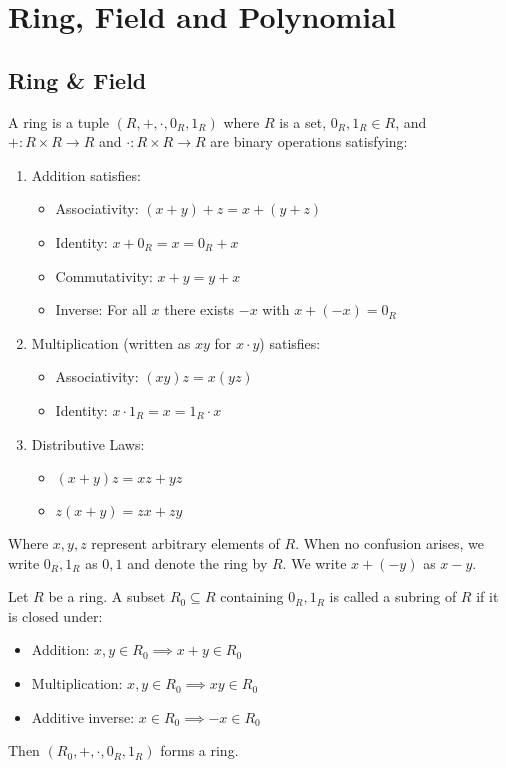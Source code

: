 
\chapter{Ring, Field and Polynomial}

\section{Ring \& Field}

\begin{definition}[Ring]
  A ring is a tuple $(R,+,\cdot,0_R,1_R)$ where $R$ is a set, $0_R,1_R \in R$, and $+: R \times R \to R$ and $\cdot: R \times R \to R$ are binary operations satisfying:
  \begin{enumerate}
    \item Addition satisfies:
      \begin{itemize}
        \item Associativity: $(x + y) + z = x + (y + z)$
        \item Identity: $x + 0_R = x = 0_R + x$
        \item Commutativity: $x + y = y + x$
        \item Inverse: For all $x$ there exists $-x$ with $x + (-x) = 0_R$
      \end{itemize}

    \item Multiplication (written as $xy$ for $x \cdot y$) satisfies:
      \begin{itemize}
        \item Associativity: $(xy)z = x(yz)$
        \item Identity: $x \cdot 1_R = x = 1_R \cdot x$
      \end{itemize}

    \item Distributive Laws:
      \begin{itemize}
        \item $(x + y)z = xz + yz$
        \item $z(x + y) = zx + zy$
      \end{itemize}
  \end{enumerate}
  Where $x,y,z$ represent arbitrary elements of $R$. When no confusion arises, we write $0_R, 1_R$ as $0,1$ and denote the ring by $R$. We write $x + (-y)$ as $x - y$.
\end{definition}

\begin{definition}[Subring]
  Let $R$ be a ring. A subset $R_0 \subseteq R$ containing $0_R, 1_R$ is called a subring of $R$ if it is closed under:
  \begin{itemize}
    \item Addition: $x,y \in R_0 \implies x + y \in R_0$
    \item Multiplication: $x,y \in R_0 \implies xy \in R_0$
    \item Additive inverse: $x \in R_0 \implies -x \in R_0$
  \end{itemize}
  Then $(R_0,+,\cdot,0_R,1_R)$ forms a ring.
\end{definition}

